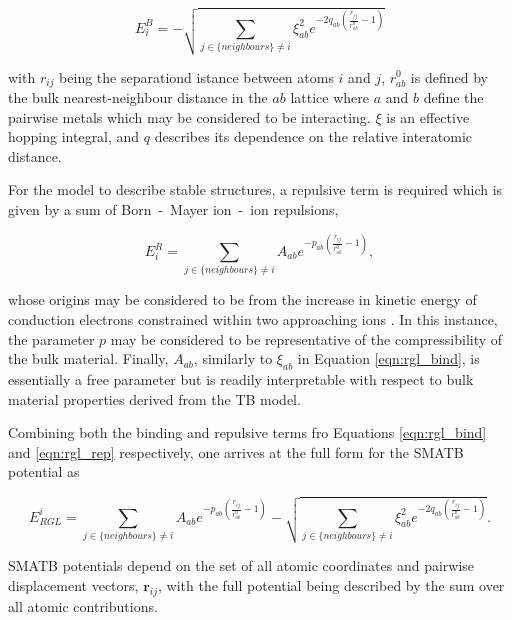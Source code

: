 \begin{equation}
    E_{i}^{B} = - \sqrt{ \sum_{j \in \lbrace neighbours \rbrace \neq i} \xi_{ab}^{2} e^{-2q_{ab}\left( \frac{r_{ij}}{r_{ab}^{0}} - 1 \right)} }
    \label{eqn:rgl_bind}
\end{equation}

with $r_{ij}$ being the separationd istance between atoms $i$ and $j$, $r_{ab}^{0}$ is defined by the bulk nearest-neighbour distance in the $ab$ lattice where $a$ and $b$ define the pairwise metals which may be considered to be interacting. $\xi$ is an effective hopping integral, and $q$ describes its dependence on the relative interatomic distance.

For the model to describe stable structures, a repulsive term is required which is given by a sum of Born~-~Mayer ion~-~ion repulsions,

\begin{equation}
    E_{i}^{R} = \sum_{j \in \lbrace neighbours \rbrace \neq i} A_{ab}e^{-p_{ab}\left( \frac{r_{ij}}{r_{ab}^{0}} - 1 \right) },
    \label{eqn:rgl_rep}
\end{equation}

whose origins may be considered to be from the increase in kinetic energy of conduction electrons constrained within two approaching ions \cite{ALLAN1979142}. In this instance, the parameter $p$ may be considered to be representative of the compressibility of the bulk material. Finally, $A_{ab}$, similarly to $\xi_{ab}$ in Equation \ref{eqn:rgl_bind}, is essentially a free parameter but is readily interpretable with respect to bulk material properties derived from the TB model.

Combining both the binding and repulsive terms fro Equations \ref{eqn:rgl_bind} and \ref{eqn:rgl_rep} respectively, one arrives at the full form for the SMATB potential as

\begin{equation}
    E_{RGL}^{i} = \sum_{j \in \lbrace neighbours \rbrace \neq i} A_{ab}e^{-p_{ab}\left( \frac{r_{ij}}{r_{ab}^{0}} - 1 \right) } - \sqrt{ \sum_{j \in \lbrace neighbours \rbrace \neq i} \xi_{ab}^{2} e^{-2q_{ab}\left( \frac{r_{ij}}{r_{ab}^{0}} - 1 \right)} }.
    \label{eqn:rgl}
\end{equation}

SMATB potentials depend on the set of all atomic coordinates and pairwise displacement vectors, $\textbf{r}_{ij}$, with the full potential being described by the sum over all atomic contributions.

